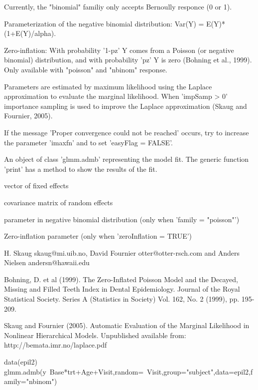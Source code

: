 \begin{Details}\relax
Currently, the "binomial" familiy only accepts Bernoully responce (0 or 1).

Parameterization of the negative binomial distribution: Var(Y) = E(Y)*(1+E(Y)/alpha).

Zero-inflation: With probability '1-pz' Y comes from a Poisson (or negative binomial) distribution,
and with probability 'pz' Y is zero (Bohning et al., 1999). Only available with "poisson" and "nbinom" response.

Parameters are estimated by maximum likelihood using the Laplace approximation to evaluate the marginal 
likelihood. When 'impSamp > 0' importance sampling is used to improve the
Laplace approximation (Skaug and Fournier, 2005).

If the message 'Proper convergence could not be reached' occurs, try to increase the parameter 'imaxfn'
and to set 'easyFlag = FALSE'.
\end{Details}
\begin{Value}
An object of class 'glmm.admb' representing the  model fit. 
The generic function 'print' has a method to show the results of the fit.

\begin{ldescription}
\item[\code{b}] vector of fixed effects
\item[\code{S}] covariance matrix of random effects
\item[\code{alpha}] parameter in negative binomial distribution (only when 'family = "poisson"')
\item[\code{pz}] Zero-inflation parameter (only when 'zeroInflation = TRUE')
\end{ldescription}
\end{Value}
\begin{Author}\relax
H. Skaug skaug@mi.uib.no, David Fournier otter@otter-rsch.com and Anders Nielsen andersn@hawaii.edu
\end{Author}
\begin{References}\relax
Bohning, D. et al (1999). The Zero-Inflated Poisson Model and the Decayed, Missing and Filled Teeth Index in Dental Epidemiology.
Journal of the Royal Statistical Society. Series A (Statistics in Society)  Vol. 162, No. 2 (1999), pp. 195-209.

Skaug and Fournier (2005). Automatic Evaluation of the Marginal Likelihood in Nonlinear Hierarchical Models. Unpublished
available from: http://bemata.imr.no/laplace.pdf
\end{References}
\begin{Examples}
\begin{ExampleCode}
  data(epil2)
  glmm.admb(y~Base*trt+Age+Visit,random=~Visit,group="subject",data=epil2,family="nbinom")
\end{ExampleCode}
\end{Examples}

